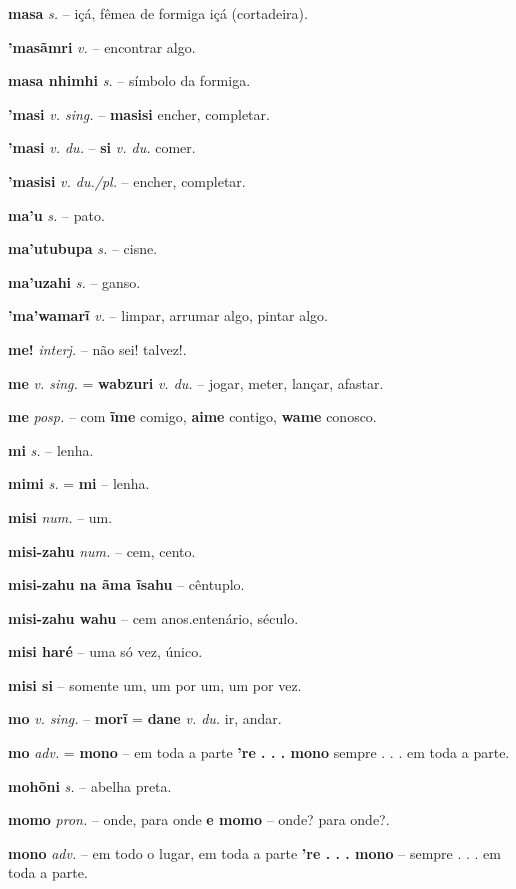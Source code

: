 \textbf{masa} \textit{s.} -- içá, fêmea de formiga içá (cortadeira).

\textbf{'masãmri} \textit{v.} -- encontrar algo.

\textbf{masa nhimhi} \textit{s.} -- símbolo da formiga.

\textbf{'masi} \textit{v. sing.} -- \textbf{masisi} encher, completar.

\textbf{'masi} \textit{v. du.} -- \textbf{si} \textit{v. du.} comer.

\textbf{'masisi} \textit{v. du./pl.} -- encher, completar.

\textbf{ma'u} \textit{s.} -- pato.

\textbf{ma'utubupa} \textit{s.} -- cisne.

\textbf{ma'uzahi} \textit{s.} -- ganso.

\textbf{'ma'wamarĩ} \textit{v.} -- limpar, arrumar algo, pintar algo.

\textbf{me!} \textit{interj.} -- não sei! talvez!.

\textbf{me} \textit{v. sing.} = \textbf{wabzuri} \textit{v. du.} -- jogar, meter, lançar, afastar.

\textbf{me} \textit{posp.} -- com  \textbf{ĩme} comigo, \textbf{aime} contigo, \textbf{wame} conosco.

\textbf{mi} \textit{s.} -- lenha.

\textbf{mimi} \textit{s.} = \textbf{mi} -- lenha.

\textbf{misi} \textit{num.} -- um.

\textbf{misi-zahu} \textit{num.} -- cem, cento.

\textbf{misi-zahu na ãma ĩsahu} -- cêntuplo.

\textbf{misi-zahu wahu} -- cem anos.entenário, século.

\textbf{misi haré} -- uma só vez, único.

\textbf{misi si} -- somente um, um por um, um por vez.

\textbf{mo} \textit{v. sing.} -- \textbf{morĩ} = \textbf{dane} \textit{v. du.} ir, andar.

\textbf{mo} \textit{adv.} = \textbf{mono} -- em toda a parte  \textbf{'re . . . mono} sempre . . . em toda a parte.

\textbf{mohõni} \textit{s.} -- abelha preta.

\textbf{momo} \textit{pron.} -- onde, para onde  \textbf{e momo} -- onde? para onde?.

\textbf{mono} \textit{adv.} -- em todo o lugar, em toda a parte  \textbf{'re . . . mono} -- sempre . . . em toda a parte.

